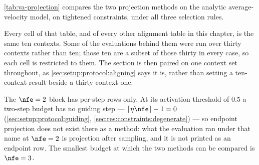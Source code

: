 \autoref{tab:va-projection} compares the two projection methods on the analytic average-velocity model,
on tightened constraints, under all three selection rules.

Every cell of that table, and of every other alignment table in this chapter, is the same ten contexts.
Some of the evaluations behind them were run over thirty contexts rather than ten; those ten are a subset
of those thirty in every case, so each cell is restricted to them. The section is then paired on one
context set throughout, as \autoref{sec:setup:protocol:aligning} says it is, rather than setting a
ten-context result beside a thirty-context one.

The $\nfe=2$ block has per-step rows only. At its activation threshold of $0.5$ a two-step budget has no
guiding step --- $\lceil \eta\nfe\rceil - 1 = 0$ (\autoref{sec:setup:protocol:guiding},
\autoref{sec:res:constraints:degenerate}) --- so endpoint projection does not exist there as a method: what
the evaluation ran under that name at $\nfe=2$ is projection after sampling, and it is not printed as an
endpoint row. The smallest budget at which the two methods can be compared is $\nfe=3$.

